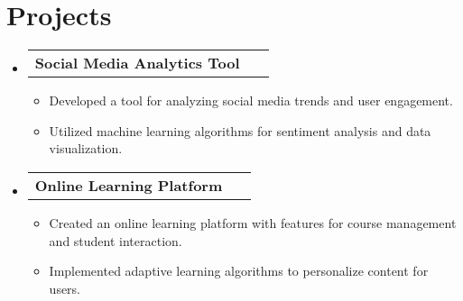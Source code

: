 \documentclass[letterpaper,11pt]{article}
\makeatletter
\newcommand{\resumeItem}[1]{
    \item\small{
      {#1 \vspace{-2pt}}
    }
  }
\newcommand{\resumeProjectHeading}[2]{
      \item
      \begin{tabular*}{0.97\textwidth}{l@{\extracolsep{\fill}}r}
        \small#1 & #2 \
      \end{tabular*}\vspace{-7pt}}
\newcommand{\resumeSubHeadingListStart}{\begin{itemize}[leftmargin=0.15in, label={}]}
\newcommand{\resumeSubHeadingListEnd}{\end{itemize}}
\newcommand{\resumeItemListStart}{\begin{itemize}}
\newcommand{\resumeItemListEnd}{\end{itemize}\vspace{-5pt}}
\makeatother
\begin{document}
      \section{Projects}
      \resumeSubHeadingListStart
          \resumeProjectHeading
            {\textbf{Social Media Analytics Tool}}{}\resumeItemListStart\resumeItem{Developed a tool for analyzing social media trends and user engagement.}
\resumeItem{Utilized machine learning algorithms for sentiment analysis and data visualization.}
\resumeItemListEnd
          \resumeProjectHeading
            {\textbf{Online Learning Platform}}{}\resumeItemListStart\resumeItem{Created an online learning platform with features for course management and student interaction.}
\resumeItem{Implemented adaptive learning algorithms to personalize content for users.}
\resumeItemListEnd
      \resumeSubHeadingListEnd
    
\end{document}

